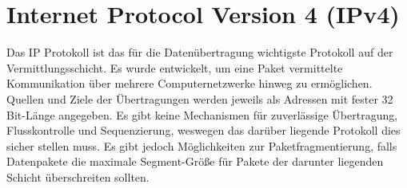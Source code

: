 \section{Internet Protocol Version 4 (IPv4)}


Das IP Protokoll ist das für die Datenübertragung wichtigste Protokoll auf der Vermittlungsschicht. Es wurde entwickelt, um eine Paket vermittelte Kommunikation über mehrere Computernetzwerke hinweg zu ermöglichen. Quellen und Ziele der Übertragungen werden jeweils als Adressen mit fester 32 Bit-Länge angegeben. Es gibt keine Mechanismen für zuverlässige Übertragung, Flusskontrolle und Sequenzierung, weswegen das darüber liegende Protokoll dies sicher stellen muss. Es gibt jedoch Möglichkeiten zur Paketfragmentierung, falls Datenpakete die maximale Segment-Größe für Pakete der darunter liegenden Schicht überschreiten sollten.

